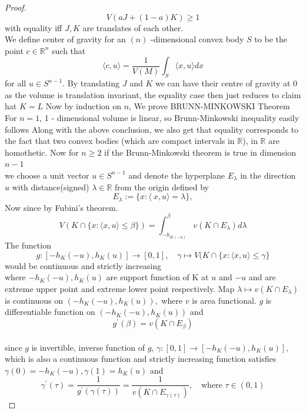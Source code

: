 \documentclass[oneside]{book}
\begin{document}
\begin{proof}
		\[
		V(a J+(1-a) K) \geq 1
		\]
		with equality iff $J, K$ are translates of each other.
		\\
		We define center of gravity for an $(n)$ -dimensional convex body $S$ to be the point $c \in \mathbb{R}^{n}$ such that
		\[
		\langle c, u\rangle=\frac{1}{V(M)} \int_{S}\langle x, u\rangle d x
		\]
		for all $u \in S^{n-1} .$ 
		By translating  $J$ and $K$ we can have their centre of gravity at 0 as the volume is translation invariant, the equality case then just reduces to claim hat $K=L$
		\hfill \break
		Now by induction on $n$, We prove  BRUNN-MINKOWSKI Theorem 
		\hfill \break
		For $n=1$, 1 - dimensional volume is linear, so Brunn-Minkowski inequality easily follows   
		\hfill \break 
		Along with the above conclusion, we also get that equality corresponds to the fact that two convex bodies (which are compact intervals in $\mathbb{R}$), in $\mathbb{R}$  are homothetic.
		\hfill \break 
		Now for $n \geq 2$ if the Brunn-Minkowski theorem is true in dimension $n-1 $
		\\
		we choose a unit vector $u \in S^{n-1}$ and denote 
		the hyperplane $E_{\lambda}$ in the direction $u$ with  distance(signed) $\lambda \in \mathbb{R} $ from the origin defined by 
		\[
		E_{\lambda}:=\{x:\langle\ x, u\rangle=\lambda\}, 
		\]
		Now since by Fubini's theorem.  
		\[
		V(K \cap\{x: \langle x, u\rangle \leq \beta\}) = \int_{-h_{ K(-u)}}^{\beta} v\left(K \cap E_{\lambda}\right) d \lambda
		\] 
		The function
		\[
		g:\left[-h_{K}(-u), h_{K}(u)\right] \rightarrow[0,1], \quad \gamma \mapsto V(K \cap\{x:\langle x, u\rangle \leq  \gamma \}
		\]
		would be  continuous and strictly increasing\\
		where $-h_{K}(-u), h_{K}(u)$ are support function of K at $u$ and $-u$ and are extreme upper point and extreme lower point respectively.
		\hfill \break
		Map $\lambda \mapsto v\left(K \cap E_{\lambda}\right)$ is continuous on $\left(-h_{K}(-u), h_{K}(u)\right),$ where $v$ is area functional.
		$g$ is differentiable function on $\left(-h_{K}(-u), h_{K}(u)\right)$ and $$g^{\prime}(\beta)=v\left(K \cap E_{\beta}\right)$$
		\\
		since $g$ is invertible, inverse function of $g$, $ \gamma:[0,1] \rightarrow\left[-h_{K}(-u), h_{K}(u)\right],$ which is also a continuous function and strictly increasing  function satisfies $ \gamma(0)=-h_{K}(-u),  \gamma(1)=h_{K}(u)$ and
		\[
		\gamma^{\prime}(\tau)=\frac{1}{g^{\prime}( \gamma(\tau))}=\frac{1}{v\left(K \cap E_{ \gamma(\tau)}\right)}, \quad  \text{where } \tau \in(0,1)
\]
\end{proof}
\end{document}

